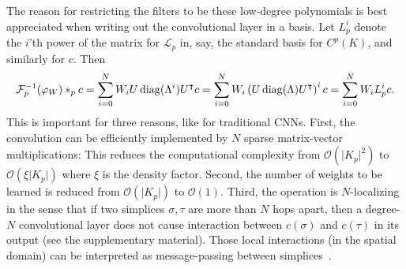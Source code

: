 The reason for restricting the filters to be these low-degree polynomials is best appreciated when writing out the convolutional layer in a basis. Let $L^i_p$ denote the $i$'th power of the matrix for $\mathcal{L}_p$ in, say, the standard basis for $C^p(K)$, and similarly for $c$. Then
\begin{equation*}
  \mathcal{F}\inv_p(\varphi_W)\ast_p c = \sum_{i=0}^N W_iU\diag(\Lambda^i)U\transpose c = \sum_{i=0}^N W_i\left(U\diag(\Lambda)U\transpose\right)^i c = \sum_{i=0}^NW_iL^i_pc. %
\end{equation*}
This is important for three reasons, like for traditional CNNs.
First, the convolution can be efficiently implemented by $N$ sparse matrix-vector multiplications: This reduces the computational complexity from $\mathcal{O}(\lvert K_p\rvert^2)$ to $\mathcal{O}(\xi\lvert K_p\rvert)$ where $\xi$ is the density factor.
Second, the number of weights to be learned is reduced from $\mathcal{O}(\lvert K_p\rvert)$ to $\mathcal{O}(1)$.
Third, the operation is $N$-localizing in the sense that if two simplices $\sigma,\tau$ are more than $N$ hops apart, then a degree-$N$ convolutional layer does not cause interaction between $c(\sigma)$ and $c(\tau)$ in its output (see the supplementary material).
Those local interactions (in the spatial domain) can be interpreted as message-passing between simplices~\cite{gilmer2017NeuralMP}.

